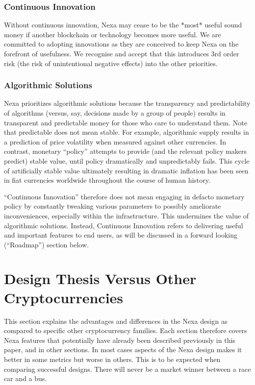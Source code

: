 \documentclass[a4paper, 11pt]{article}
\begin{document}
\subsubsection{Continuous Innovation}
Without continuous innovation, Nexa may cease to be the *most* useful sound money if another blockchain or technology becomes more useful.  We are committed to adopting innovations as they are conceived to keep Nexa on the forefront of usefulness.  We recognise and accept that this introduces 3rd order risk (the risk of unintentional negative effects) into the other priorities.

\subsubsection{Algorithmic Solutions}
Nexa prioritizes algorithmic solutions because the transparency and predictability of algorithms (versus, say, decisions made by a group of people) results in transparent and predictable money for those who care to understand them.  Note that predictable does not mean stable.  For example, algorithmic supply results in a prediction of price volatility when measured against other currencies.  In contrast, monetary “policy” attempts to provide (and the relevant policy makers predict) stable value, until policy dramatically and unpredictably fails.  This cycle of artificially stable value ultimately resulting in dramatic inflation has been seen in fiat currencies worldwide throughout the course of human history.  

“Continuous Innovation” therefore does not mean engaging in defacto monetary policy by constantly tweaking various parameters to possibly ameliorate inconveniences, especially within the infrastructure.  This undermines the value of algorithmic solutions.  Instead, Continuous Innovation refers to delivering useful and important features to end users, as will be discussed in a forward looking (“Roadmap”) section below.

\section{Design Thesis Versus Other Cryptocurrencies}
This section explains the advantages and differences in the Nexa design as compared to specific other cryptocurrency families.  Each section therefore covers Nexa features that potentially have already been described previously in this paper, and in other sections.  In most cases aspects of the Nexa design makes it better in some metrics but worse in others.  This is to be expected when comparing successful designs.  There will never be a market winner between a race car and a bus.
\end{document}
